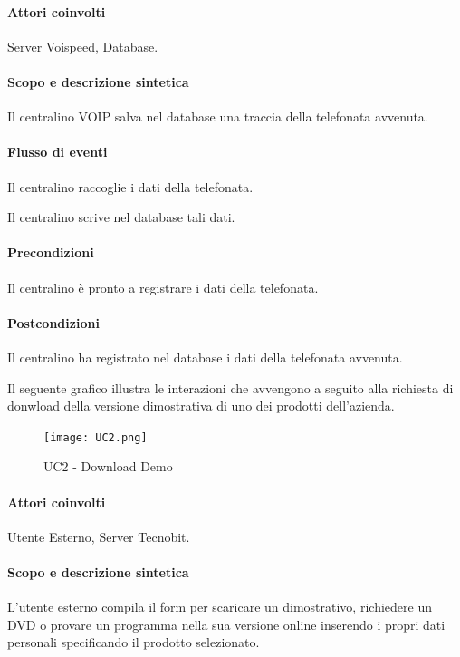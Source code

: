 \paragraph{Attori coinvolti} Server Voispeed, Database.
\paragraph{Scopo e descrizione sintetica}
Il centralino VOIP salva nel database una traccia della telefonata avvenuta.
\paragraph{Flusso di eventi}
\begin{elenconumerato}[\textbf{}]{\subsubsecindent}
\item Il centralino raccoglie i dati della telefonata.
\item Il centralino scrive nel database tali dati.
\end{elenconumerato}
\paragraph{Precondizioni} Il centralino \`e pronto a registrare i dati della telefonata.
\paragraph{Postcondizioni} Il centralino ha registrato nel database i dati della telefonata avvenuta.

\newpage
{}
\label{uc_download}
Il seguente grafico illustra le interazioni che avvengono a seguito alla richiesta di donwload della versione dimostrativa di uno dei prodotti dell'azienda.

\begin{figure}[!ht]
\centering
\texttt{[image: UC2.png]}
\caption{UC2 - Download Demo}
\end{figure}

\paragraph{Attori coinvolti} Utente Esterno, Server Tecnobit.
\paragraph{Scopo e descrizione sintetica}
L'utente esterno compila il form per scaricare un dimostrativo, richiedere un DVD o provare un programma nella sua versione online inserendo i propri dati personali specificando il prodotto selezionato.
